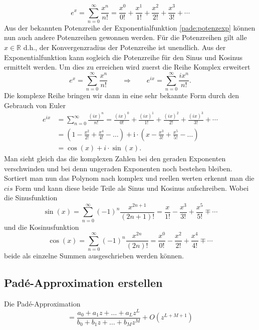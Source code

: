 \begin{equation}
e^{x}
=
\sum_{n=0}^{\infty} \frac{x^{n}}{n !}
=
\frac{x^{0}}{0 !}+\frac{x^{1}}{1 !}+\frac{x^{2}}{2 !}+\frac{x^{3}}{3 !}+\cdots 
\label{pade:potenzexp}
\end{equation}
Aus der bekannten Potenzreihe der Exponentialfunktion \ref{pade:potenzexp} können nun auch andere Potenzreihen gewonnen werden.
Für die Potenzreihen gilt alle $x \in \mathbb{R}$ d.h., der Konvergenzradius der Potenzreihe ist unendlich. 
Aus der Exponentialfunktion kann sogleich die Potenzreihe für den Sinus und Kosinus ermittelt werden.
Um dies zu erreichen wird zuerst die Reihe Komplex erweitert
\begin{equation*}
e^{x}
=
\sum_{n=0}^{\infty} \frac{x^{n}}{n !}
\qquad\Rightarrow\qquad
e^{ix}
=
\sum_{n=0}^{\infty} \frac{ix^{n}}{n !}.
\end{equation*}
Die komplexe Reihe bringen wir dann in eine sehr bekannte Form durch den Gebrauch von Euler 
\begin{align*}
e^{ix}
&=
\sum_{n=0}^{\infty} \frac{(ix)^{n}}{n !}
=
\frac{(ix)^{0}}{0 !}+\frac{(ix)^{1}}{1 !}+\frac{(ix)^{2}}{2 !}+\frac{(ix)^{3}}{3 !}+\cdots
\\
&=
\left(1-\frac{x^{2}}{2 !}+\frac{x^{4}}{4 !}-\ldots\right)+\mathrm{i} \cdot\left(x-\frac{x^{3}}{3 !}+\frac{x^{5}}{5 !}-\ldots\right)
\\
&=
\cos(x)+i\cdot \sin(x).
\end{align*}
Man sieht gleich das die komplexen Zahlen bei den geraden Exponenten verschwinden und bei denn ungeraden Exponenten noch bestehen bleiben. 
Sortiert man nun das Polynom nach komplex und reellen werten erkennt man die $cis$ Form und kann diese beide Teile als Sinus und Kosinus aufschreiben.
Wobei die Sinusfunktion 
\begin{equation*}
\sin (x)=\sum_{n=0}^{\infty}(-1)^{n} \frac{x^{2 n+1}}{(2 n+1) !}=\frac{x}{1 !}-\frac{x^{3}}{3 !}+\frac{x^{5}}{5 !} \mp \cdots
\end{equation*}
und die Kosinusfunktion 
\begin{equation*}
\cos (x)=\sum_{n=0}^{\infty}(-1)^{n} \frac{x^{2 n}}{(2 n) !}=\frac{x^{0}}{0 !}-\frac{x^{2}}{2 !}+\frac{x^{4}}{4 !} \mp \cdots
\end{equation*}
beide als einzelne Summen ausgeschrieben werden können.



\subsection{Padé-Approximation erstellen
	\label{pade:subsection:Pade_erstellen}}

Die Padé-Approximation 
\begin{equation}
[L/M]
=
\frac{a_0 + a_1 z + \dots + a_L z^L}{b_0 + b_1 z + \dots + b_M z^M}
+O(z^{L+M+1})
\end{equation}






